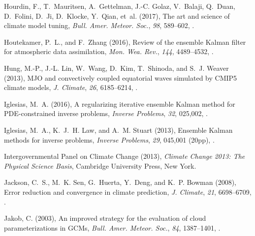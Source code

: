 \documentclass[draft]{agujournal}
\begin{document}
\begin{thebibliography}{196}
Hourdin, F., T.~Mauritsen, A.~Gettelman, J.-C. Golaz, V.~Balaji, Q.~Duan,
  D.~Folini, D.~Ji, D.~Klocke, Y.~Qian, et~al. (2017), The art and science of
  climate model tuning, \textit{Bull. Amer. Meteor. Soc.}, \textit{98},
  589--602, .

Houtekamer, P.~L., and F.~Zhang (2016), Review of the ensemble {K}alman filter
  for atmospheric data assimilation, \textit{Mon. Wea. Rev.}, \textit{144},
  4489--4532, .

Hung, M.-P., J.-L. Lin, W.~Wang, D.~Kim, T.~Shinoda, and S.~J. Weaver (2013),
  {MJO} and convectively coupled equatorial waves simulated by {CMIP5} climate
  models, \textit{J. Climate}, \textit{26}, 6185--6214,
  .

Iglesias, M.~A. (2016), A regularizing iterative ensemble {K}alman method for
  {PDE}-constrained inverse problems, \textit{Inverse Problems}, \textit{32},
  025,002, .

Iglesias, M.~A., K.~J.~H. Law, and A.~M. Stuart (2013), Ensemble {Kalman}
  methods for inverse problems, \textit{Inverse Problems}, \textit{29}, 045,001
  (20pp), .

{Intergovernmental Panel on Climate Change} (2013), \textit{Climate Change
  2013: {T}he Physical Science Basis}, Cambridge University Press, New York.

Jackson, C.~S., M.~K. Sen, G.~Huerta, Y.~Deng, and K.~P. Bowman (2008), Error
  reduction and convergence in climate prediction, \textit{J. Climate},
  \textit{21}, 6698--6709, .

Jakob, C. (2003), An improved strategy for the evaluation of cloud
  parameterizations in {GCMs}, \textit{Bull. Amer. Meteor. Soc.}, \textit{84},
  1387--1401, .


\end{thebibliography}
\end{document}
